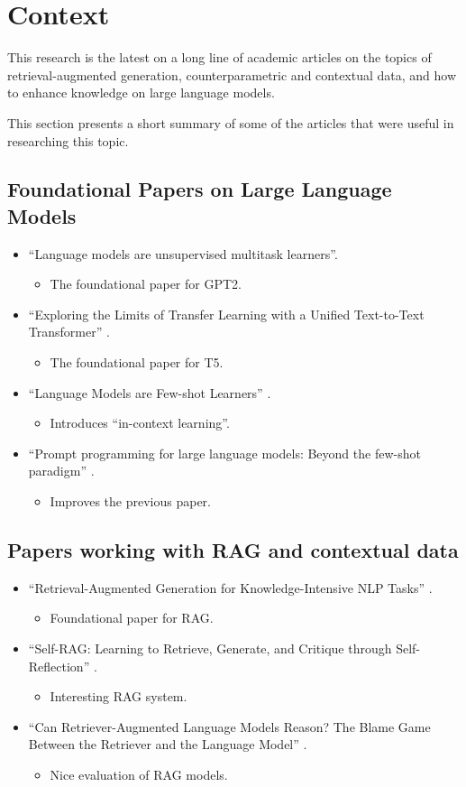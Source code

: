 \section{Context}

This research is the latest on a long line of academic articles on the topics of retrieval-augmented generation, counterparametric and contextual data, and how to enhance knowledge on large language models.

This section presents a short summary of some of the articles that were useful in researching this topic.


\subsection{Foundational Papers on Large Language Models}
\newcommand{\mart}[1]{\begin{itemize} \item #1 \end{itemize}}
\begin{itemize}
	\item ``Language models are unsupervised multitask learners''\citep{gpt2}.
		\mart{The foundational paper for GPT2.}
	\item ``Exploring the Limits of Transfer Learning with a Unified Text-to-Text Transformer'' \citep{t5}.
		\mart{The foundational paper for T5.}
	\item ``Language Models are Few-shot Learners'' \citep{fewshotlearners}.
		\mart{Introduces ``in-context learning''.}
	\item ``Prompt programming for large language models: Beyond the few-shot paradigm'' \citep{beyondfewshot}.
		\mart{Improves the previous paper.}
\end{itemize}

\subsection{Papers working with RAG and contextual data}
\begin{itemize}
	\item ``Retrieval-Augmented Generation for Knowledge-Intensive NLP Tasks'' \citep{rag}.
		\mart{Foundational paper for RAG.}
	\item ``Self-RAG: Learning to Retrieve, Generate, and Critique through Self-Reflection'' \citep{selfrag}.
		\mart{Interesting RAG system.}
	\item ``Can Retriever-Augmented Language Models Reason? The Blame Game Between the Retriever and the Language Model'' \citep{can_rag_models_reason}.
		\mart{Nice evaluation of RAG models.}
\end{itemize}

